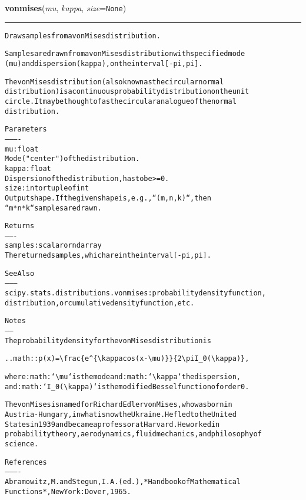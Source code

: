 \hspace{.8\funcindent}\begin{boxedminipage}{\funcwidth}

    \raggedright \textbf{vonmises}(\textit{mu}, \textit{kappa}, \textit{size}={\tt None})

    \vspace{-1.5ex}

    \rule{\textwidth}{0.5\fboxrule}
\setlength{\parskip}{2ex}
\begin{alltt}
Draw samples from a von Mises distribution.

Samples are drawn from a von Mises distribution with specified mode
(mu) and dispersion (kappa), on the interval [-pi, pi].

The von Mises distribution (also known as the circular normal
distribution) is a continuous probability distribution on the unit
circle.  It may be thought of as the circular analogue of the normal
distribution.

Parameters
----------
mu : float
    Mode ("center") of the distribution.
kappa : float
    Dispersion of the distribution, has to be {\textgreater}=0.
size : int or tuple of int
    Output shape.  If the given shape is, e.g., ``(m, n, k)``, then
    ``m * n * k`` samples are drawn.

Returns
-------
samples : scalar or ndarray
    The returned samples, which are in the interval [-pi, pi].

See Also
--------
scipy.stats.distributions.vonmises : probability density function,
    distribution, or cumulative density function, etc.

Notes
-----
The probability density for the von Mises distribution is

.. math:: p(x) = {\textbackslash}frac\{e{\textasciicircum}\{{\textbackslash}kappa cos(x-{\textbackslash}mu)\}\}\{2{\textbackslash}pi I\_0({\textbackslash}kappa)\},

where :math:`{\textbackslash}mu` is the mode and :math:`{\textbackslash}kappa` the dispersion,
and :math:`I\_0({\textbackslash}kappa)` is the modified Bessel function of order 0.

The von Mises is named for Richard Edler von Mises, who was born in
Austria-Hungary, in what is now the Ukraine.  He fled to the United
States in 1939 and became a professor at Harvard.  He worked in
probability theory, aerodynamics, fluid mechanics, and philosophy of
science.

References
----------
Abramowitz, M. and Stegun, I. A. (ed.), *Handbook of Mathematical
Functions*, New York: Dover, 1965.


\end{alltt}
\end{boxedminipage}

